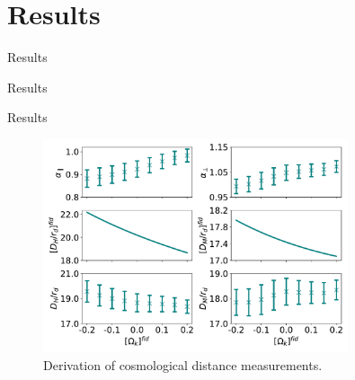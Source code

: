 \documentclass{beamer}
\begin{document}
\section{Results}
\begin{frame}{Results}
	 
\end{frame}
\begin{frame}{Results}
	 
\end{frame}
\begin{frame}{Results}
	\begin{figure}[t]
		\centering
		\includegraphics[width=0.8\textwidth]{../figs/phase2_DA_DH_flat.pdf}
		\caption{Derivation of cosmological distance measurements.}
		\label{fig:phase2}
	\end{figure}
	 
\end{frame}
\end{document}
